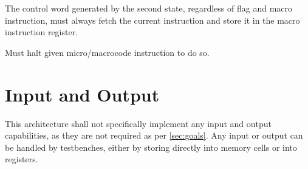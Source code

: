 \begin{feat-requirement}
  The control word generated by the second state, regardless of flag and macro instruction, must always fetch the current instruction and store it in the macro instruction register.
\end{feat-requirement}


\begin{feat-requirement}
  Must halt given micro/macrocode instruction to do so. 
\end{feat-requirement}

\section{Input and Output}
This architecture shall not specifically implement any input and output capabilities, as they are not required as per \ref{sec:goals}. Any input or output can be handled by testbenches, either by storing directly into memory cells or into registers.